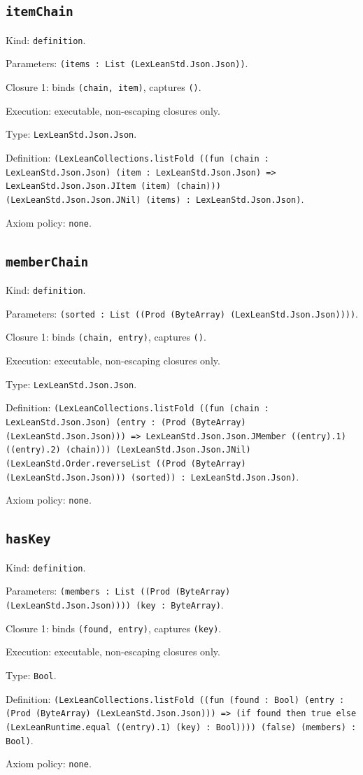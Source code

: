 \documentclass[11pt]{article}
\begin{document}
\subsection*{\texttt{itemChain}}
\noindent Kind: \texttt{definition}.\par
\noindent Parameters: \texttt{(items : List (LexLeanStd.Json.Json))}.\par
\noindent Closure 1: binds \texttt{(chain, item)}, captures \texttt{()}.\par
\noindent Execution: executable, non-escaping closures only.\par
\noindent Type: \texttt{LexLeanStd.Json.Json}.\par
\noindent Definition: \texttt{(LexLeanCollections.listFold ((fun (chain : LexLeanStd.Json.Json) (item : LexLeanStd.Json.Json) => LexLeanStd.Json.Json.JItem (item) (chain))) (LexLeanStd.Json.Json.JNil) (items) : LexLeanStd.Json.Json)}.\par
\noindent Axiom policy: \texttt{none}.\par
\subsection*{\texttt{memberChain}}
\noindent Kind: \texttt{definition}.\par
\noindent Parameters: \texttt{(sorted : List ((Prod (ByteArray) (LexLeanStd.Json.Json))))}.\par
\noindent Closure 1: binds \texttt{(chain, entry)}, captures \texttt{()}.\par
\noindent Execution: executable, non-escaping closures only.\par
\noindent Type: \texttt{LexLeanStd.Json.Json}.\par
\noindent Definition: \texttt{(LexLeanCollections.listFold ((fun (chain : LexLeanStd.Json.Json) (entry : (Prod (ByteArray) (LexLeanStd.Json.Json))) => LexLeanStd.Json.Json.JMember ((entry).1) ((entry).2) (chain))) (LexLeanStd.Json.Json.JNil) (LexLeanStd.Order.reverseList ((Prod (ByteArray) (LexLeanStd.Json.Json))) (sorted)) : LexLeanStd.Json.Json)}.\par
\noindent Axiom policy: \texttt{none}.\par
\subsection*{\texttt{hasKey}}
\noindent Kind: \texttt{definition}.\par
\noindent Parameters: \texttt{(members : List ((Prod (ByteArray) (LexLeanStd.Json.Json)))) (key : ByteArray)}.\par
\noindent Closure 1: binds \texttt{(found, entry)}, captures \texttt{(key)}.\par
\noindent Execution: executable, non-escaping closures only.\par
\noindent Type: \texttt{Bool}.\par
\noindent Definition: \texttt{(LexLeanCollections.listFold ((fun (found : Bool) (entry : (Prod (ByteArray) (LexLeanStd.Json.Json))) => (if found then true else (LexLeanRuntime.equal ((entry).1) (key) : Bool)))) (false) (members) : Bool)}.\par
\noindent Axiom policy: \texttt{none}.\par
\end{document}
